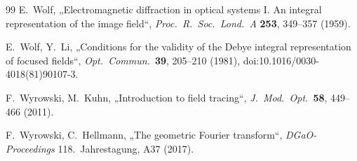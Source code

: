 \documentclass[11pt,a4paper]{scrartcl}
\theoremstyle{insightstyle}
\begin{document}
\begin{thebibliography}{99}
 E.~Wolf, „Electromagnetic diffraction in optical systems I. An integral representation of the image field“, \emph{Proc.\ R.\ Soc.\ Lond.\ A} \textbf{253}, 349--357 (1959).

 E.~Wolf, Y.~Li, „Conditions for the validity of the Debye integral representation of focused fields“, \emph{Opt.\ Commun.}\ \textbf{39}, 205--210 (1981), doi:10.1016/0030-4018(81)90107-3.

 F.~Wyrowski, M.~Kuhn, „Introduction to field tracing“, \emph{J.\ Mod.\ Opt.}\ \textbf{58}, 449--466 (2011).

 F.~Wyrowski, C.~Hellmann, „The geometric Fourier transform“, \emph{DGaO-Proceedings} 118.~Jahrestagung, A37 (2017).

\end{thebibliography}
\end{document}
